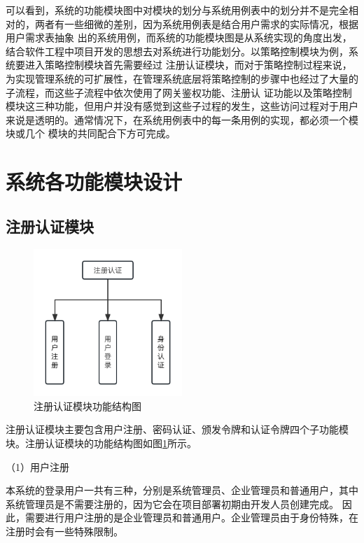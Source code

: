 可以看到，系统的功能模块图中对模块的划分与系统用例表中的划分并不是完全相对的，两者有一些细微的差别，因为系统用例表是结合用户需求的实际情况，根据用户需求表抽象
出的系统用例，而系统的功能模块图是从系统实现的角度出发，结合软件工程中项目开发的思想去对系统进行功能划分。以策略控制模块为例，系统要进入策略控制模块首先需要经过
注册认证模块，而对于策略控制过程来说，为实现管理系统的可扩展性，在管理系统底层将策略控制的步骤中也经过了大量的子流程，而这些子流程中依次使用了网关鉴权功能、注册认
证功能以及策略控制模块这三种功能，但用户并没有感觉到这些子过程的发生，这些访问过程对于用户来说是透明的。通常情况下，在系统用例表中的每一条用例的实现，都必须一个模块或几个
模块的共同配合下方可完成。

\section{系统各功能模块设计}

\subsection{注册认证模块}



\begin{figure}[h]
    \centering
    \includegraphics[width=0.5\textwidth]{my_figures/chapter4/注册认证模块功能结构图.png}
    \caption{注册认证模块功能结构图}
    \label{fig:注册认证模块功能结构图}
\end{figure}

注册认证模块主要包含用户注册、密码认证、颁发令牌和认证令牌四个子功能模块。注册认证模块的功能结构图如图\ref{fig:注册认证模块功能结构图}所示。



（1）用户注册

本系统的登录用户一共有三种，分别是系统管理员、企业管理员和普通用户，其中系统管理员是不需要注册的，因为它会在项目部署初期由开发人员创建完成。
因此，需要进行用户注册的是企业管理员和普通用户。企业管理员由于身份特殊，在注册时会有一些特殊限制。

